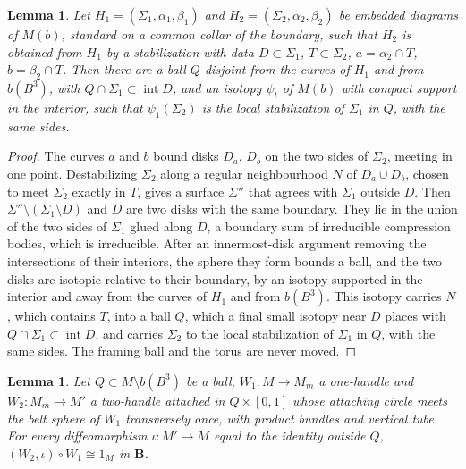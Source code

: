 \documentclass[11pt]{amsart}
\newtheorem{lemma}[theorem]{Lemma}
\theoremstyle{definition}
\theoremstyle{remark}
\theoremstyle{plain}
\numberwithin{equation}{section}
\newcommand{\bB}{\mathbf{B}}
\begin{document}
\begin{lemma}\label{lem:stab-factor}
Let $H_1=(\Sigma_1,\alpha_1,\beta_1)$ and $H_2=(\Sigma_2,\alpha_2,\beta_2)$ be
embedded diagrams of $M(b)$, standard on a common collar of the boundary,
such that $H_2$ is obtained from $H_1$ by a stabilization with data
$D\subset\Sigma_1$, $T\subset\Sigma_2$, $a=\alpha_2\cap T$, $b=\beta_2\cap T$. Then
there are a ball $Q$ disjoint from the curves of $H_1$ and from $b(B^3)$,
with $Q\cap\Sigma_1\subset\operatorname{int}D$, and an isotopy $\psi_t$ of $M(b)$
with compact support in the interior, such that $\psi_1(\Sigma_2)$ is the
local stabilization of $\Sigma_1$ in $Q$, with the same sides.
\end{lemma}

\begin{proof}
The curves $a$ and $b$ bound disks $D_a$, $D_b$ on the two sides of $\Sigma_2$,
meeting in one point. Destabilizing $\Sigma_2$ along a regular neighbourhood $N$ of
$D_a\cup D_b$, chosen to meet $\Sigma_2$ exactly in $T$, gives a surface $\Sigma''$ that agrees with $\Sigma_1$ outside $D$. Then
$\Sigma''\setminus(\Sigma_1\setminus D)$ and $D$ are two disks with the same boundary. They
lie in the union of the two sides of $\Sigma_1$ glued along $D$, a boundary sum of
irreducible compression bodies, which is irreducible. After an innermost-disk argument
removing the intersections of their interiors, the sphere they form bounds a ball, and the
two disks are isotopic relative to their boundary, by an isotopy
supported in the interior and away from the curves of $H_1$ and from $b(B^3)$. This
isotopy carries $N$, which contains $T$, into a ball $Q$, which a final small isotopy near
$D$ places with $Q\cap\Sigma_1\subset\operatorname{int}D$, and carries $\Sigma_2$ to the local stabilization of $\Sigma_1$ in $Q$,
with the same sides. The framing ball and the torus are never moved.
\end{proof}


\begin{lemma}\label{lem:output-identification}
Let $Q\subset M\setminus b(B^3)$ be a ball, $W_1\colon M\to M_m$ a one-handle
and $W_2\colon M_m\to M'$ a two-handle attached in $Q\times[0,1]$ whose
attaching circle meets the belt sphere of $W_1$ transversely once, with product
bundles and vertical tube. For every diffeomorphism $\iota\colon M'\to M$ equal
to the identity outside $Q$, $(W_2,\iota)\circ W_1\cong1_M$ in $\bB$.
\end{lemma}
\end{document}
